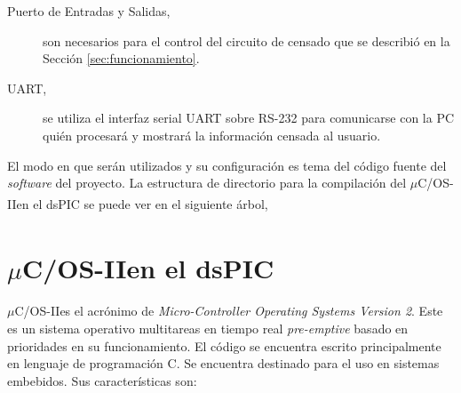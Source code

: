 \documentclass[11pt,a4paper,oneside]{article}
\def\uCOS{$\mu$C/OS-II\texttrademark}
\begin{document}
\begin{description}
\item[Puerto de Entradas y Salidas,] son necesarios para el control del circuito de censado que se describió en la Sección \ref{sec:funcionamiento}.
\item[UART,] se utiliza el interfaz serial UART sobre RS-232 para comunicarse con la PC quién procesará y mostrará la información censada al usuario.
\end{description}

El modo en que serán utilizados y su configuración es tema del código fuente del \textsl{software} del proyecto. La estructura de directorio para la compilación del \uCOS en el dsPIC\textsuperscript{\textregistered} se puede ver en el siguiente árbol,


\section{\uCOS en el dsPIC\textsuperscript{\textregistered}}
\label{sec:ucos-ii}

\uCOS es el acrónimo de \textsl{Micro-Controller Operating Systems Version 2}. Este es un sistema operativo multitareas en tiempo real \textsl{pre-emptive} basado en prioridades en su funcionamiento. El código se encuentra escrito principalmente en lenguaje de programación C. Se encuentra destinado para el uso en sistemas embebidos. Sus características son:
\end{document}
